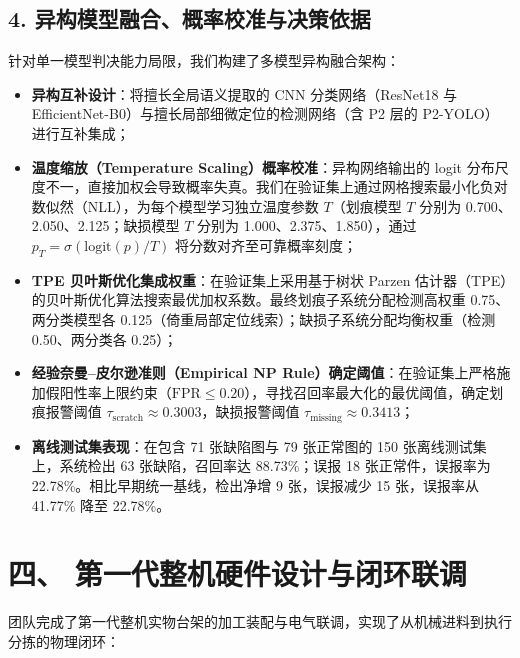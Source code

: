 \subsection*{4. 异构模型融合、概率校准与决策依据}
针对单一模型判决能力局限，我们构建了多模型异构融合架构：
\begin{itemize}
    \item \textbf{异构互补设计}：将擅长全局语义提取的 CNN 分类网络（ResNet18 与 EfficientNet-B0）与擅长局部细微定位的检测网络（含 P2 层的 P2-YOLO）进行互补集成；
    \item \textbf{温度缩放（Temperature Scaling）概率校准}：异构网络输出的 logit 分布尺度不一，直接加权会导致概率失真。我们在验证集上通过网格搜索最小化负对数似然（NLL），为每个模型学习独立温度参数 $T$（划痕模型 $T$ 分别为 0.700、2.050、2.125；缺损模型 $T$ 分别为 1.000、2.375、1.850），通过 $p_T = \sigma(\text{logit}(p)/T)$ 将分数对齐至可靠概率刻度；
    \item \textbf{TPE 贝叶斯优化集成权重}：在验证集上采用基于树状 Parzen 估计器（TPE）的贝叶斯优化算法搜索最优加权系数。最终划痕子系统分配检测高权重 0.75、两分类模型各 0.125（倚重局部定位线索）；缺损子系统分配均衡权重（检测 0.50、两分类各 0.25）；
    \item \textbf{经验奈曼–皮尔逊准则（Empirical NP Rule）确定阈值}：在验证集上严格施加假阳性率上限约束（$\text{FPR} \le 0.20$），寻找召回率最大化的最优阈值，确定划痕报警阈值 $\tau_{\text{scratch}} \approx 0.3003$，缺损报警阈值 $\tau_{\text{missing}} \approx 0.3413$；
    \item \textbf{离线测试集表现}：在包含 71 张缺陷图与 79 张正常图的 150 张离线测试集上，系统检出 63 张缺陷，召回率达 88.73\%；误报 18 张正常件，误报率为 22.78\%。相比早期统一基线，检出净增 9 张，误报减少 15 张，误报率从 41.77\% 降至 22.78\%。
\end{itemize}

\section*{四、 第一代整机硬件设计与闭环联调}

团队完成了第一代整机实物台架的加工装配与电气联调，实现了从机械进料到执行分拣的物理闭环：

